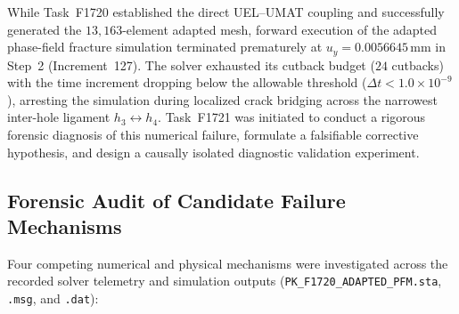 While Task~F1720 established the direct UEL--UMAT coupling and successfully generated the $13{,}163$-element adapted mesh, forward execution of the adapted phase-field fracture simulation terminated prematurely at $u_y = 0.0056645\,\mathrm{mm}$ in Step~2 (Increment~127). The solver exhausted its cutback budget ($24$ cutbacks) with the time increment dropping below the allowable threshold ($\Delta t < 1.0 \times 10^{-9}$), arresting the simulation during localized crack bridging across the narrowest inter-hole ligament $h_3 \leftrightarrow h_4$. Task~F1721 was initiated to conduct a rigorous forensic diagnosis of this numerical failure, formulate a falsifiable corrective hypothesis, and design a causally isolated diagnostic validation experiment.

\subsection{Forensic Audit of Candidate Failure Mechanisms}
\label{subsec:f1721_forensics}

Four competing numerical and physical mechanisms were investigated across the recorded solver telemetry and simulation outputs (\texttt{PK\_F1720\_ADAPTED\_PFM.sta}, \texttt{.msg}, and \texttt{.dat}):

